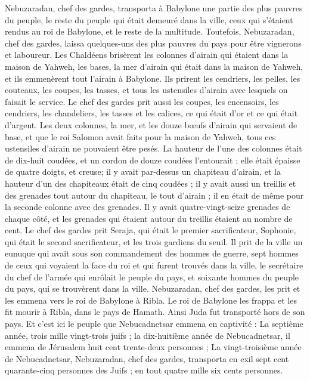 \begin{multicols}{2}
Nebuzaradan, chef des gardes, transporta à Babylone une partie des plus pauvres du peuple, le reste du peuple qui était demeuré dans la ville, ceux qui s'étaient rendus au roi de Babylone, et le reste de la multitude.
Toutefois, Nebuzaradan, chef des gardes, laissa quelques-uns des plus pauvres du pays pour être vignerons et laboureur.
Les Chaldéens brisèrent les colonnes d'airain qui étaient dans la maison de Yahweh, les bases, la mer d'airain qui était dans la maison de Yahweh, et ils emmenèrent tout l'airain à Babylone.
Ils prirent les cendriers, les pelles, les couteaux, les coupes, les tasses, et tous les ustensiles d'airain avec lesquels on faisait le service.
Le chef des gardes prit aussi les coupes, les encensoirs, les cendriers, les chandeliers, les tasses et les calices, ce qui était d'or et ce qui était d'argent.
Les deux colonnes, la mer, et les douze bœufs d'airain qui servaient de base, et que le roi Salomon avait faits pour la maison de Yahweh, tous ces ustensiles d'airain ne pouvaient être pesés.
La hauteur de l'une des colonnes était de dix-huit coudées, et un cordon de douze coudées l'entourait ; elle était épaisse de quatre doigts, et creuse;
il y avait par-dessus un chapiteau d'airain, et la hauteur d'un des chapiteaux était de cinq coudées ; il y avait aussi un treillis et des grenades tout autour du chapiteau, le tout d'airain ; il en était de même pour la seconde colonne avec des grenades.
Il y avait quatre-vingt-seize grenades de chaque côté, et les grenades qui étaient autour du treillis étaient au nombre de cent.
Le chef des gardes prit Seraja, qui était le premier sacrificateur, Sophonie, qui était le second sacrificateur, et les trois gardiens du seuil.
Il prit de la ville un eunuque qui avait sous son commandement des hommes de guerre, sept hommes de ceux qui voyaient la face du roi et qui furent trouvés dans la ville, le secrétaire du chef de l'armée qui enrôlait le peuple du pays, et soixante hommes du peuple du pays, qui se trouvèrent dans la ville.
Nebuzaradan, chef des gardes, les prit et les emmena vers le roi de Babylone à Ribla.
Le roi de Babylone les frappa et les fit mourir à Ribla, dans le pays de Hamath. Ainsi Juda fut transporté hors de son pays.
Et c'est ici le peuple que Nebucadnetsar emmena en captivité : La septième année, trois mille vingt-trois juifs ;
la dix-huitième année de Nebucadnetsar, il emmena de Jérusalem huit cent trente-deux personnes ;
La vingt-troisième année de Nebucadnetsar, Nebuzaradan, chef des gardes, transporta en exil sept cent quarante-cinq personnes des Juifs ; en tout quatre mille six cents personnes.

\end{multicols}
